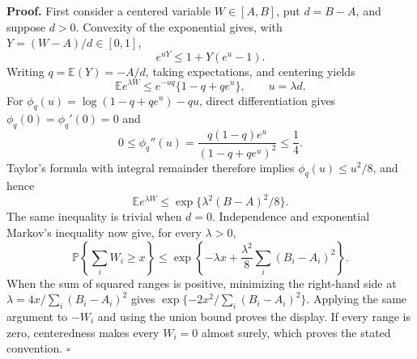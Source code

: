 \textbf{Proof.}
First consider a centered variable \(W\in[A,B]\), put \(d=B-A\), and suppose \(d>0\). Convexity of the exponential gives, with \(Y=(W-A)/d\in[0,1]\),
\[
e^{uY}\le1+Y(e^u-1).
\]
Writing \(q=\mathbb E(Y)=-A/d\), taking expectations, and centering yields
\[
\mathbb E e^{\lambda W}
\le e^{-uq}\{1-q+qe^u\},\qquad u=\lambda d.
\]
For \(\phi_q(u)=\log(1-q+qe^u)-qu\), direct differentiation gives \(\phi_q(0)=\phi_q'(0)=0\) and
\[
0\le\phi_q''(u)=\frac{q(1-q)e^u}{(1-q+qe^u)^2}\le\frac14.
\]
Taylor's formula with integral remainder therefore implies \(\phi_q(u)\le u^2/8\), and hence
\[
\mathbb E e^{\lambda W}\le\exp\{\lambda^2(B-A)^2/8\}.
\]
The same inequality is trivial when \(d=0\). Independence and exponential Markov's inequality now give, for every \(\lambda>0\),
\[
\mathbb P\left\{\sum_iW_i\ge x\right\}
\le\exp\left\{-\lambda x+\frac{\lambda^2}{8}\sum_i(B_i-A_i)^2\right\}.
\]
When the sum of squared ranges is positive, minimizing the right-hand side at \(\lambda=4x/\sum_i(B_i-A_i)^2\) gives \(\exp\{-2x^2/\sum_i(B_i-A_i)^2\}\). Applying the same argument to \(-W_i\) and using the union bound proves the display. If every range is zero, centeredness makes every \(W_i=0\) almost surely, which proves the stated convention. \(\square\)